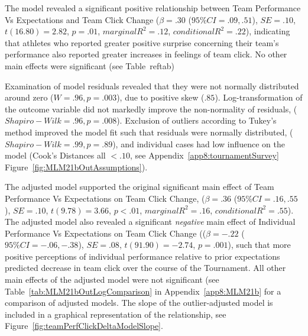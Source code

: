 \begin{CJK}{UTF8}{gbsn}

The model revealed a significant positive relationship between Team Performance Vs Expectations and Team Click Change ($\beta = .30$ ($95\% CI =  .09, .51$), $SE = .10$, $t(16.80) = 2.82$, $p = .01$, $marginal R^2 = .12$, $conditional R^2 = .22$), indicating that athletes who reported greater positive surprise concerning their team's performance also reported greater increases in feelings of team click. No other main effects were significant (see Table~ref{tab})

Examination of model residuals revealed that they were not normally distributed around zero ($W = .96, p = .003$), due to positive skew ($.85$). Log-transformation of the outcome variable did not markedly improve the non-normality of residuals, ($Shapiro-Wilk = .96, p = .008$). Exclusion of outliers according to Tukey's method \citep[observations above and below 1.5x the Inter Quartile Range (IQR); see][]{Tukey1977} improved the model fit such that residuals were normally distributed, ($Shapiro-Wilk = .99, p = .89$), and individual cases had low influence on the model (Cook's Distances all $< .10$, see Appendix~\ref{app8:tournamentSurvey} Figure~\ref{fig:MLM21bOutAssumptions}).





The adjusted model supported the original significant main effect of Team Performance Vs Expectations on Team Click Change, ($\beta = .36$ ($95\% CI =  .16, .55$), $SE = .10$, $t(9.78) = 3.66$, $p < .01$, $marginal R^2 = .16$, $conditional R^2 = .55$). The adjusted model also revealed a significant \textit{negative} main effect of Individual Performance Vs Expectations on Team Click Change (($\beta = -.22$ ($95\% CI =  -.06, -.38$), $SE = .08$, $t(91.90) = -2.74$, $p = .001$), such that more positive perceptions of individual performance relative to prior expectations predicted decrease in team click over the course of the Tournament.
All other main effects of the adjusted model were not significant (see Table~\ref{tab:MLM21bOutLogComparison} in Appendix~\ref{app8:MLM21b} for a comparison of adjusted models.  The slope of the outlier-adjusted model is included in a graphical representation of the relationship, see Figure~\ref{fig:teamPerfClickDeltaModelSlope}.


\end{CJK}
